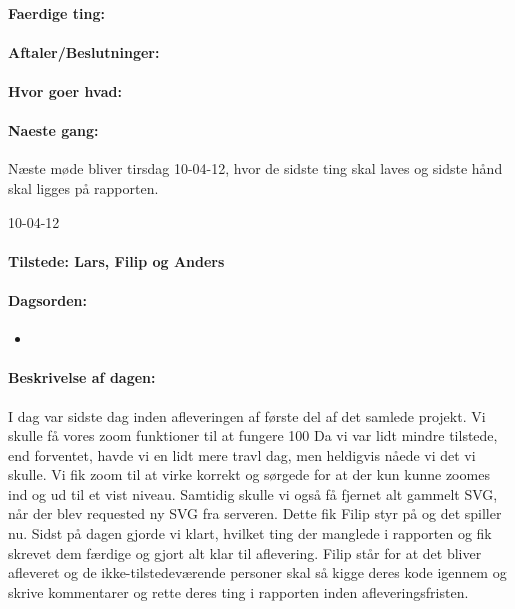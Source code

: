 \documentclass[a4paper,10pt,titlepage]{article}
\begin{document}
		\paragraph{Faerdige ting:}
		
		\paragraph{Aftaler/Beslutninger:}
		
		\paragraph{Hvor goer hvad:}
		
		\paragraph{Naeste gang:}
		Næste møde bliver tirsdag 10-04-12, hvor de sidste ting skal laves og sidste hånd skal ligges på rapporten. \mbox{}\\ 
		
		\begin{center}
		10-04-12
		\end{center}
		
		\paragraph{Tilstede: Lars, Filip og Anders}
		\paragraph{Dagsorden:}
		\begin{itemize}
					\item 
					 
		\end{itemize}
		
		\paragraph{Beskrivelse af dagen:}
		I dag var sidste dag inden afleveringen af første del af det samlede projekt. Vi skulle få vores zoom funktioner til at fungere 100%
Da vi var lidt mindre tilstede, end forventet, havde vi en lidt mere travl dag, men heldigvis nåede vi det vi skulle. Vi fik zoom til at virke korrekt og sørgede for at der kun kunne zoomes ind og ud til et vist niveau. Samtidig skulle vi også få fjernet alt gammelt SVG, når der blev requested ny SVG fra serveren. Dette fik Filip styr på og det spiller nu. Sidst på dagen gjorde vi klart, hvilket ting der manglede i rapporten og fik skrevet dem færdige og gjort alt klar til aflevering. Filip står for at det bliver afleveret og de ikke-tilstedeværende personer skal så kigge deres kode igennem og skrive kommentarer og rette deres ting i rapporten inden afleveringsfristen.
\end{document}
